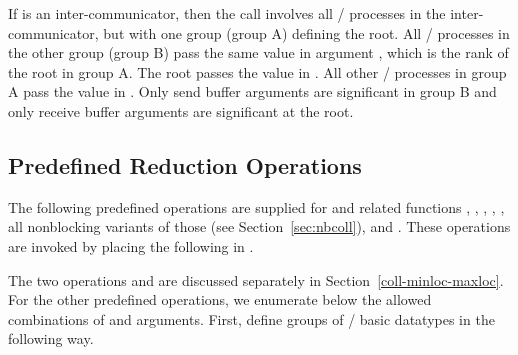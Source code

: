 If  is an inter-communicator, then the call involves all
\MPI/ processes in the inter-communicator, but with one group (group A) defining the
root.  All \MPI/ processes in the other group (group B) pass the same value
in argument
, which is the rank of the root in group A.  The root
passes the value  in .
All other \MPI/ processes in group A pass the value  in
.
Only send buffer arguments are significant in group B and only receive
buffer arguments are significant at the root.

\subsection{Predefined Reduction Operations}
\label{coll-predefined-op}

The following predefined operations are supplied for 
and related functions ,
, ,
,
, all
nonblocking variants of those (see Section~\ref{sec:nbcoll}), and
.  These operations are invoked by placing
the following in .

\begin{constlist}
\noconstitem{}{ }
\end{constlist}

The two operations  and  are
discussed separately in Section~\ref{coll-minloc-maxloc}.
For the other predefined operations,
we enumerate below the allowed combinations of  and
 arguments.
First, define groups of \MPI/ basic datatypes
in the following way.


